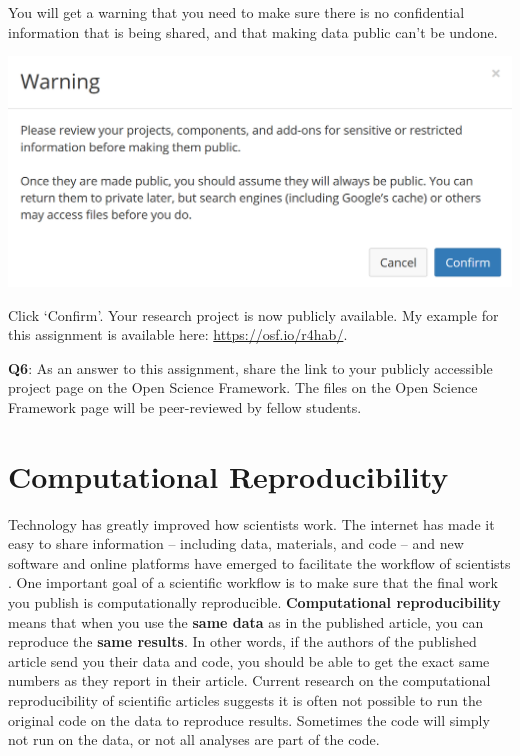 \documentclass[
  oneside]{book}
\begin{document}
You will get a warning that you need to make sure there is no confidential information that is being shared, and that making data public can't be undone.

\begin{center}\includegraphics[width=1\linewidth]{images/ae3d492ab7249bafc5969ba8345d58ca} \end{center}

Click `Confirm'. Your research project is now publicly available. My example for this assignment is available here: \url{https://osf.io/r4hab/}.

\textbf{Q6}: As an answer to this assignment, share the link to your publicly accessible project page on the Open Science Framework. The files on the Open Science Framework page will be peer-reviewed by fellow students.

\hypertarget{computationalreproducibility}{%
\chapter{Computational Reproducibility}\label{computationalreproducibility}}

Technology has greatly improved how scientists work. The internet has made it
easy to share information -- including data, materials, and code -- and new
software and online platforms have emerged to facilitate the workflow of
scientists \citep{spellman_short_2015}. One important goal of a scientific workflow is to make sure that the
final work you publish is computationally reproducible. \textbf{Computational
reproducibility} means that when you use the \textbf{same data} as in the published
article, you can reproduce the \textbf{same results}. In other words, if the authors
of the published article send you their data and code, you should be able to get
the exact same numbers as they report in their article. Current research on the
computational reproducibility of scientific articles suggests it is often not
possible to run the original code on the data to reproduce results. Sometimes
the code will simply not run on the data, or not all analyses are part of the
code.
\end{document}
